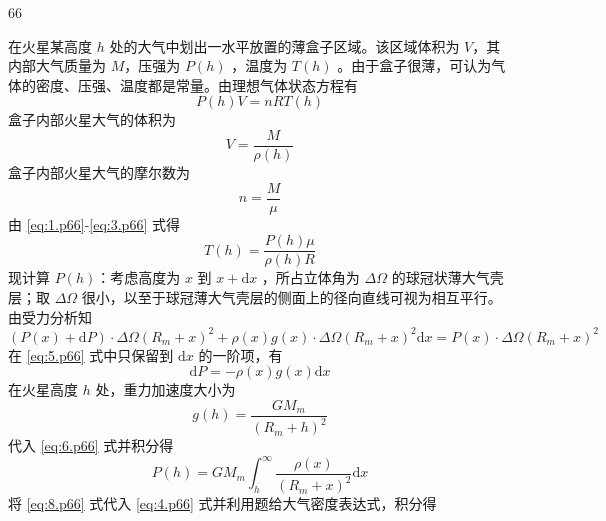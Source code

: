 \begin{solution}{66}
    \begin{subsolution}
        在火星某高度 $h$ 处的大气中划出一水平放置的薄盒子区域。该区域体积为 $V$，其内部大气质量为 $M$，压强为 $P(h)$ ，温度为 $T(h)$ 。由于盒子很薄，可认为气体的密度、压强、温度都是常量。由理想气体状态方程有
        \begin{equation}
            P(h) V = n R T(h) \label{eq:1.p66}
        \end{equation}
        盒子内部火星大气的体积为
        \begin{equation}
            V = \frac{M}{\rho(h)} \label{eq:2.p66}
        \end{equation}
        盒子内部火星大气的摩尔数为
        \begin{equation}
            n = \frac{M}{\mu} \label{eq:3.p66}
        \end{equation}
        由 \eqref{eq:1.p66}-\eqref{eq:3.p66} 式得
        \begin{equation}
            T(h) = \frac{P(h) \mu}{\rho(h) R} \label{eq:4.p66}
        \end{equation}
        现计算 $P(h)$：考虑高度为 $x$ 到 $x+\mathrm{d}x$ ，所占立体角为 $\Delta\Omega$ 的球冠状薄大气壳层；取 $\Delta\Omega$ 很小，以至于球冠薄大气壳层的侧面上的径向直线可视为相互平行。由受力分析知
        \begin{equation}
            (P(x)+\mathrm{d}P) \cdot \Delta\Omega (R_{m}+x)^{2} + \rho(x) g(x) \cdot \Delta\Omega (R_{m}+x)^{2} \mathrm{d}x = P(x) \cdot \Delta\Omega (R_{m}+x)^{2} \label{eq:5.p66}
        \end{equation}
        在 \eqref{eq:5.p66} 式中只保留到 $\mathrm{d}x$ 的一阶项，有
        \begin{equation}
            \mathrm{d}P = -\rho(x) g(x) \mathrm{d}x \label{eq:6.p66}
        \end{equation}
        在火星高度 $h$ 处，重力加速度大小为
        \begin{equation}
            g(h) = \frac{G M_{m}}{(R_{m}+h)^{2}} \label{eq:7.p66}
        \end{equation}
        代入 \eqref{eq:6.p66} 式并积分得
        \begin{equation}
            P(h) = G M_{m} \int_{h}^{\infty} \frac{\rho(x)}{(R_{m}+x)^{2}} \mathrm{d}x \label{eq:8.p66}
        \end{equation}
        将 \eqref{eq:8.p66} 式代入 \eqref{eq:4.p66} 式并利用题给大气密度表达式，积分得
        \begin{equation}

\end{equation}
\end{subsolution}
\end{solution}
